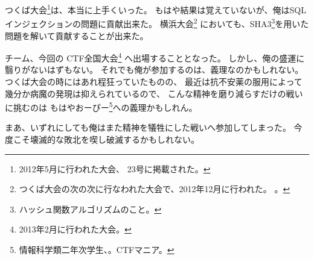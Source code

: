 つくば大会\footnote{2012年5月に行われた大会、{\WORD} 23号に掲載された。}は、本当に上手くいった。
もはや結果は覚えていないが、俺はSQLインジェクションの問題に貢献出来た。
横浜大会\footnote{%
つくば大会の次の次に行なわれた大会で、2012年12月に行われた。
。}%
においても、SHA3\footnote{ハッシュ関数アルゴリズムのこと。}を用いた問題を解いて貢献することが出来た。

チーム、今回の{\SECCON} CTF全国大会\footnote{2013年2月に行われた大会。}%
へ出場することとなった。
しかし、俺の盛運に翳りがないはずもない。
それでも俺が参加するのは、義理なのかもしれない。
つくば大会の時にはあれ程狂っていたものの、
最近は抗不安薬の服用によって幾分か病魔の発現は抑えられているので、
こんな精神を磨り減らすだけの戦いに挑むのは
もはやおーぴー\footnote{情報科学類二年次学生、。CTFマニア。}への義理かもしれん。

まあ、いずれにしても俺はまた精神を犠牲にした戦いへ参加してしまった。
今度こそ壊滅的な敗北を喫し破滅するかもしれない。
